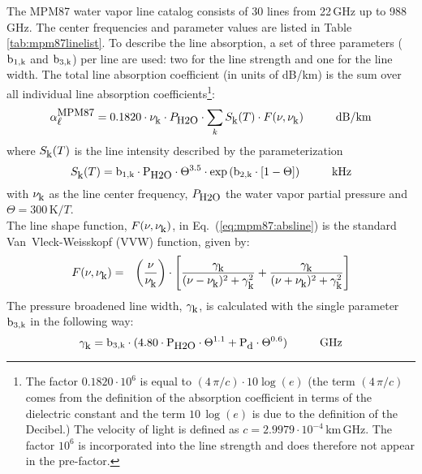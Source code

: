 \label{levele:mpm87_h2olines}
The MPM87 \cite{liebeandlayton:87} water vapor line catalog consists 
of 30 lines from 22\,GHz up to 988\,GHz. The center frequencies and parameter 
values are listed in Table \ref{tab:mpm87linelist}. To describe the line 
absorption, a set of three parameters ($\rm b_{\rm 1,k}$ and $\rm b_{\rm 3,k}$) per line are used: two 
for the line strength and one for the line width. The total line 
absorption coefficient (in units of dB/km) is the sum over all 
individual line absorption coefficients\footnote{The factor 
  $0.1820 \cdot 10^{6}$ is equal to $(4\,\pi/c)\cdot 10\log{(e)}$
  (the term $(4\,\pi/c)$ comes from the definition of the absorption
  coefficient in terms of the dielectric constant and the term 
  $10\,\log{(e)}$ is due to the definition of the Decibel.) The
  velocity of light is defined as $c=2.9979\cdot 10^{-4}$\,km\,GHz. 
  The factor $10^{6}$ is incorporated into the line strength and 
  does therefore not appear in the pre-factor.}:
\begin{equation}
  \label{eq:mpm87:absline}
  \alphampmol = 0.1820 \cdot \nuk \cdot \phzo \cdot 
  \sum_{k}{\inten \cdot \shape}\hspace*{10mm}\mbox{dB/km}
\end{equation}
where $S_{\mbox{\rm \small k}}(T)$ is the line intensity described by the parameterization
\begin{equation}
  \label{eq:mpm87:strength}
  \inten = \bek \cdot \phzo \cdot \Theta^{3.5} 
           \cdot \exp{(\bzk \cdot [1-\Theta])}\hspace*{10mm}\mbox{kHz}
\end{equation}
with $\nu_{\mbox{\rm \small k}}$ as the line center frequency, $P_{\mbox{\rm \small H2O}}$ the water
vapor partial pressure and $\Theta = 300\,\mbox{K}/T$.\\
The line shape function, $F(\nu,\nu_{\mbox{\rm \small k}})$, in Eq.~(\ref{eq:mpm87:absline}) 
is the standard Van~Vleck-Weisskopf (VVW) function, given by:
\begin{eqnarray}
  \label{eq:mpm87:VVW}
  F(\nu,\nu_{\mbox{\rm \small k}}) & = & \left(\frac{\nu}{\nu_{\mbox{\rm \small k}}}\right) \cdot 
               \left[\frac{\gamma_{\mbox{\rm \small k}}}{(\nu - \nu_{\mbox{\rm \small k}})^2 + \gamma_{\mbox{\rm \small k}}^2} + 
                     \frac{\gamma_{\mbox{\rm \small k}}}{(\nu + \nu_{\mbox{\rm \small k}})^2 + \gamma_{\mbox{\rm \small k}}^2}\right]\\
\end{eqnarray}
The pressure broadened line width, $\gamma_{\mbox{\rm \small k}}$, is calculated with the 
single parameter $\rm b_{\rm 3,k}$ in the following way:
\begin{equation}
  \label{eq:mpm87:gamma}
  \gamk = \bdk \cdot 
          (4.80 \cdot \phzo \cdot \Theta^{1.1} + \pda \cdot
          \Theta^{0.6})\hspace*{10mm}\mbox{GHz}
\end{equation}
